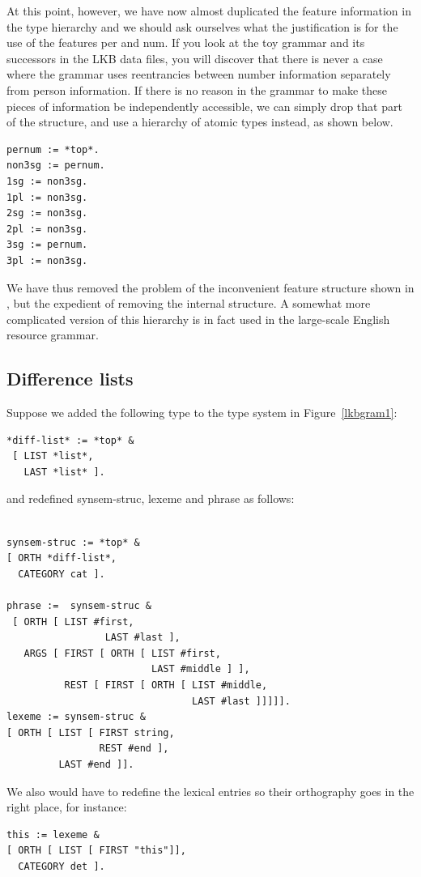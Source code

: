 \documentclass[12pt]{report}
\begin{document}
At this point, however, we have now almost duplicated the feature information 
in the type hierarchy and
we should ask ourselves what the justification is for
the use of the features {\feature per} and {\feature num}.  
If you look at the toy grammar and
its successors in the LKB data files, you will discover that there
is never a case where the grammar uses reentrancies between
number information
separately from person information.
If there is no reason in the grammar
to make these pieces of information be independently
accessible, we can simply drop that part of the structure, and use a hierarchy
of atomic types instead, as shown below.
\begin{verbatim}
pernum := *top*.
non3sg := pernum.
1sg := non3sg.
1pl := non3sg.
2sg := non3sg.
2pl := non3sg.
3sg := pernum.
3pl := non3sg.
\end{verbatim}
We have thus removed the problem of the inconvenient
feature structure shown in , but the expedient
of removing the internal structure.
A somewhat more complicated version of this hierarchy is in fact
used in the large-scale
English resource grammar.  

\subsection{Difference lists}

Suppose we added the following type to 
the type system in Figure~\ref{lkbgram1}:
\begin{verbatim}
*diff-list* := *top* &
 [ LIST *list*,
   LAST *list* ].
\end{verbatim}
and redefined {\type synsem-struc}, {\type lexeme} and
{\type phrase} as follows:
\begin{verbatim}

synsem-struc := *top* &
[ ORTH *diff-list*,
  CATEGORY cat ].

phrase :=  synsem-struc &
 [ ORTH [ LIST #first,
                 LAST #last ],
   ARGS [ FIRST [ ORTH [ LIST #first,
                         LAST #middle ] ], 
          REST [ FIRST [ ORTH [ LIST #middle,
                                LAST #last ]]]]].
lexeme := synsem-struc &
[ ORTH [ LIST [ FIRST string,
                REST #end ],
         LAST #end ]].

\end{verbatim}
We also would have to
redefine the lexical entries so their orthography
goes in the right place, for instance: 
\begin{verbatim}
this := lexeme &
[ ORTH [ LIST [ FIRST "this"]],
  CATEGORY det ].
\end{verbatim}
\end{document}
